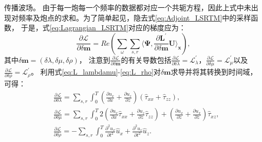 传播波场。
由于每一炮每一个频率的数据都对应一个共轭方程，因此上式中未出现对频率及炮点的求和。为了简单起见，隐去式\eqref{eq:Adjoint_LSRTM}中的采样函数，
于是，式\eqref{eq:Lagrangian_LSRTM}对应的梯度应为：
\begin{equation}
    \frac{\partial\mathcal{L}}{\partial \delta\mathbf{m}}=Re\left(\sum_{\omega}\sum_{s,r}
	\langle\bm\Psi,\frac{\partial
		\mathbf{L}^{'}}{\partial\delta\mathbf{m}}\mathbf{U}\rangle_{\mathbf{x}}\right),
    \label{eq:Gradient_LSRTM}
\end{equation}
其中$\delta\mathbf{m}=(\delta\lambda, \delta\mu,\delta\rho)$，
注意到$\frac{\partial\mathcal{L}}{\partial \delta\mathbf{m}}$的有关导数包括$\frac{\partial\mathcal{L}}{\partial 
\delta\lambda}=\mathcal{L}^{'}_{\lambda}$，$\frac{\partial\mathcal{L}}{\partial\delta\mu}=\mathcal{L}^{'}_{\mu}$以及
$\frac{\partial\mathcal{L}}{\partial\delta\rho}=\mathcal{L}^{'}_{\rho}$。
利用式\eqref{eq:L_lambdamu}-\eqref{eq:L_rho}对$\delta\mathbf{m}$求导并将其转换到时间域，
可得：
\begin{equation}
\begin{split}
   & \frac{\partial\mathcal{L}}{\partial \delta\lambda}=\sum_{s,r}\int^T_{0}
	(\frac{\partial u_x}{\partial x}+\frac{\partial u_z}{\partial z})(\hat{\tau}_{xx}+\hat{\tau}_{zz}),\\
   & \frac{\partial\mathcal{L}}{\partial \delta\mu}=\sum_{s,r}\int^T_{0}
	2(\frac{\partial u_x}{\partial x}\hat{\tau}_{xx}+\frac{\partial u_z}{\partial z}\hat{\tau}_{zz})+
	(\frac{\partial u_x}{\partial z}+\frac{\partial u_x}{\partial z})\hat{\tau}_{xz},\\
   & \frac{\partial\mathcal{L}}{\partial \delta\rho}=-\sum_{s,r}\int^T_{0}
   \frac{\partial^2 u_x}{\partial t^2}\hat{u}_x+\frac{\partial^2 u_z}{\partial t^2}\hat{u}_{z}.
    \label{eq:Gradient_lambdamurho_LSRTM}
\end{split}
\end{equation}

